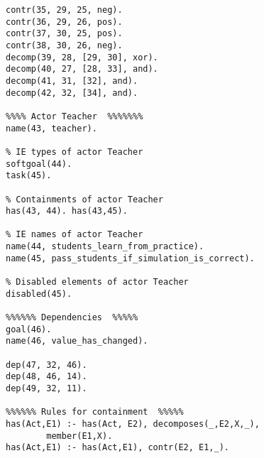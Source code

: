 \begin{multicols}{2}
\begin{Verbatim}[fontsize=\scriptsize]
% Links of actor Traffic Tycoon
contr(35, 29, 25, neg).
contr(36, 29, 26, pos).
contr(37, 30, 25, pos).
contr(38, 30, 26, neg).
decomp(39, 28, [29, 30], xor).
decomp(40, 27, [28, 33], and).
decomp(41, 31, [32], and).
decomp(42, 32, [34], and).

%%%% Actor Teacher  %%%%%%%
name(43, teacher).

% IE types of actor Teacher
softgoal(44).
task(45).

% Containments of actor Teacher
has(43, 44). has(43,45).

% IE names of actor Teacher
name(44, students_learn_from_practice).
name(45, pass_students_if_simulation_is_correct).

% Disabled elements of actor Teacher
disabled(45).

%%%%%% Dependencies  %%%%%
goal(46).
name(46, value_has_changed).

dep(47, 32, 46).
dep(48, 46, 14).
dep(49, 32, 11).

%%%%%% Rules for containment  %%%%%
has(Act,E1) :- has(Act, E2), decomposes(_,E2,X,_), 
        member(E1,X).
has(Act,E1) :- has(Act,E1), contr(E2, E1,_).
\end{Verbatim}
\end{multicols}